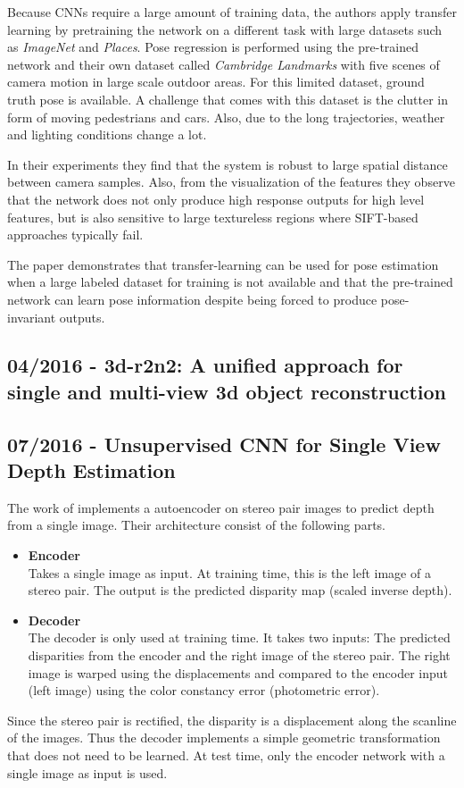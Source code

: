 		Because CNNs require a large amount of training data, the authors apply transfer learning by pretraining the network on a different task with large datasets such as \emph{ImageNet} and \emph{Places}.
		Pose regression is performed using the pre-trained network and their own dataset called \emph{Cambridge Landmarks} with five scenes of camera motion in large scale outdoor areas.
		For this limited dataset, ground truth pose is available.
		A challenge that comes with this dataset is the clutter in form of moving pedestrians and cars.
		Also, due to the long trajectories, weather and lighting conditions change a lot.
		
		In their experiments they find that the system is robust to large spatial distance between camera samples.
		Also, from the visualization of the features they observe that the network does not only produce high response outputs for high level features, but is also sensitive to large textureless regions where {SIFT}-based approaches typically fail.
		
		The paper demonstrates that transfer-learning can be used for pose estimation when a large labeled dataset for training is not available and that the pre-trained network can learn pose information despite being forced to produce pose-invariant outputs.
		
		
	\subsection{04/2016 - 3d-r2n2: A unified approach for single and multi-view 3d object reconstruction}
		
		\cite{choy20163d}
		
	\subsection{07/2016 - Unsupervised CNN for Single View Depth Estimation}
		
		The work of \cite{garg2016} implements a autoencoder on stereo pair images to predict depth from a single image.
		Their architecture consist of the following parts.
		\begin{itemize}
			\item \textbf{Encoder}
				\\
				Takes a single image as input. 
				At training time, this is the left image of a stereo pair.
				The output is the predicted disparity map (scaled inverse depth).
			\item \textbf{Decoder}
				\\
				The decoder is only used at training time.
				It takes two inputs: The predicted disparities from the encoder and the right image of the stereo pair.
				The right image is warped using the displacements and compared to the encoder input (left image) using the color constancy error (photometric error).
		\end{itemize}
		Since the stereo pair is rectified, the disparity is a displacement along the scanline of the images.
		Thus the decoder implements a simple geometric transformation that does not need to be learned.
		At test time, only the encoder network with a single image as input is used.
		
